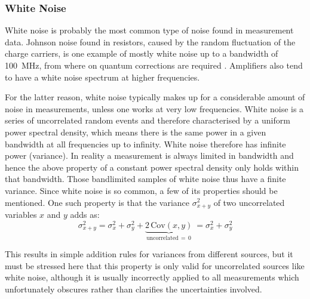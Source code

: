 \subsubsection{White Noise}%
\label{sec:white_noise}
White noise is probably the most common type of noise found in measurement data. Johnson noise found in resistors, caused by the random fluctuation of the charge carriers, is one example of mostly white noise up to a bandwidth of \qty{100}{\MHz}, from where on quantum corrections are required \cite{nist_johnson_noise}. Amplifiers also tend to have a white noise spectrum at higher frequencies.

For the latter reason, white noise typically makes up for a considerable amount of noise in measurements, unless one works at very low frequencies. White noise is a series of uncorrelated random events and therefore characterised by a uniform power spectral density, which means there is the same power in a given bandwidth at all frequencies up to infinity. White noise therefore has infinite power (variance). In reality a measurement is always limited in bandwidth and hence the above property of a constant power spectral density only holds within that bandwidth. Those bandlimited samples of white noise thus have a finite variance.
Since white noise is so common, a few of its properties should be mentioned. One such property is that the variance $\sigma_{x+y}^2$ of two uncorrelated variables $x$ and $y$ adds as:
\begin{equation}
    \sigma_{x+y}^2  = \sigma_x^2 + \sigma_y^2 + \underbrace{2\,\mathrm{Cov}(x,y)}_{\text{uncorrelated}\, =\, 0}\ = \sigma_x^2 + \sigma_y^2 \label{eqn:adding_white_noise}
\end{equation}

This results in simple addition rules for variances from different sources, but it must be stressed here that this property is only valid for uncorrelated sources like white noise, although it is usually incorrectly applied to all measurements which unfortunately obscures rather than clarifies the uncertainties involved.

